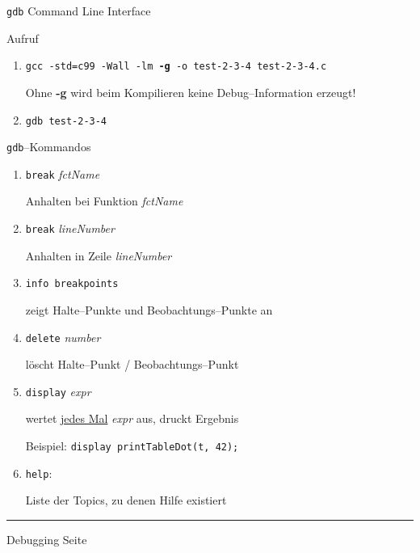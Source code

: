 
\begin{slide}{}
\normalsize

\begin{center}
\texttt{gdb} Command Line Interface
\end{center}
\vspace*{0.5cm}

\footnotesize
Aufruf
\begin{enumerate}
\item \texttt{gcc -std=c99 -Wall -lm {\bf -g} -o test-2-3-4 test-2-3-4.c}

      Ohne {\bf -g} wird beim Kompilieren keine Debug--Information erzeugt!
\item \texttt{gdb test-2-3-4}
\end{enumerate}

\texttt{gdb}--Kommandos
\begin{enumerate}
\item \texttt{break} \textsl{fctName}

       Anhalten bei Funktion \textsl{fctName}
\item \texttt{break} \textsl{lineNumber}

       Anhalten in Zeile \textsl{lineNumber}
\item \texttt{info breakpoints}

       zeigt Halte--Punkte und Beobachtungs--Punkte an
\item \texttt{delete} \textsl{number}

       l\"oscht  Halte--Punkt / Beobachtungs--Punkt

\item \texttt{display} \textsl{expr}

       wertet \underline{jedes Mal} \textsl{expr} aus, druckt Ergebnis

       Beispiel: \texttt{display printTableDot(t, 42);}
\item \texttt{help}: 

       Liste der Topics, zu denen Hilfe existiert
\end{enumerate}

\vspace*{\fill}
\tiny \addtocounter{mypage}{1}
\rule{17cm}{1mm}
Debugging  \hspace*{\fill} Seite 
\end{slide}


